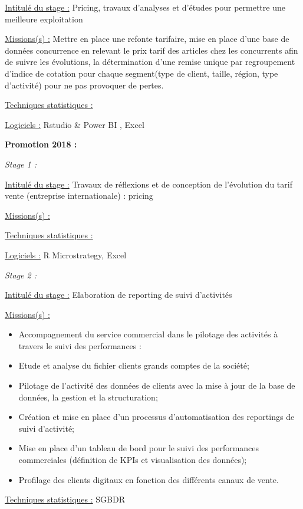 \documentclass[
  letterpaper,
  DIV=11,
  numbers=noendperiod]{scrreprt}
\begin{document}
\uline{Intitulé du stage :} Pricing, travaux d'analyses et d'études pour
permettre une meilleure exploitation

\uline{Missions(s) :} Mettre en place une refonte tarifaire, mise en
place d'une base de données concurrence en relevant le prix tarif des
articles chez les concurrents afin de suivre les évolutions, la
détermination d'une remise unique par regroupement d'indice de cotation
pour chaque segment(type de client, taille, région, type d'activité)
pour ne pas provoquer de pertes.

\uline{Techniques statistiques :}

\uline{Logiciels :} Rstudio \& Power BI , Excel

\textbf{Promotion 2018 :}

\emph{Stage 1 :}

\uline{Intitulé du stage :} Travaux de réflexions et de conception de
l'évolution du tarif vente (entreprise internationale) : pricing

\uline{Missions(s) :}

\uline{Techniques statistiques :}

\uline{Logiciels :} R Microstrategy, Excel

\emph{Stage 2 :}

\uline{Intitulé du stage :} Elaboration de reporting de suivi
d'activités

\uline{Missions(s) :}

\begin{itemize}
\item
  Accompagnement du service commercial dans le pilotage des activités à
  travers le suivi des performances :
\item
  Etude et analyse du fichier clients grands comptes de la société;
\item
  Pilotage de l'activité des données de clients avec la mise à jour de
  la base de données, la gestion et la structuration;
\item
  Création et mise en place d'un processus d'automatisation des
  reportings de suivi d'activité;
\item
  Mise en place d'un tableau de bord pour le suivi des performances
  commerciales (définition de KPIs et visualisation des données);
\item
  Profilage des clients digitaux en fonction des différents canaux de
  vente.
\end{itemize}

\uline{Techniques statistiques :} SGBDR
\end{document}
